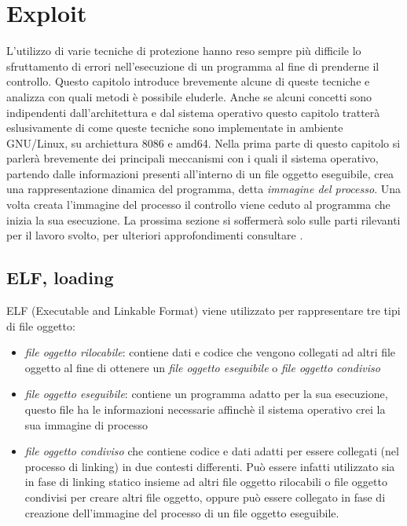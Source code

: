\chapter{Exploit}

L'utilizzo di varie tecniche di protezione hanno reso sempre più
difficile lo sfruttamento di errori nell'esecuzione di un programma al
fine di prenderne il controllo. Questo capitolo introduce brevemente
alcune di queste tecniche e analizza con quali metodi è possibile
eluderle. Anche se alcuni concetti sono indipendenti dall'architettura
e dal sistema operativo questo capitolo tratterà eslusivamente di come
queste tecniche sono implementate in ambiente GNU/Linux, su
archiettura 8086 e amd64. Nella prima parte di questo capitolo si
parlerà brevemente dei principali meccanismi con i quali il sistema
operativo, partendo dalle informazioni presenti all'interno di un file
oggetto eseguibile, crea una rappresentazione dinamica del programma,
detta \emph{immagine del processo}. Una volta creata l'immagine del
processo il controllo viene ceduto al programma che inizia la sua
esecuzione. La prossima sezione si soffermerà solo sulle parti
rilevanti per il lavoro svolto, per ulteriori approfondimenti
consultare \cited{}.

\section{ELF, loading}

ELF (Executable and Linkable Format) viene utilizzato per 
rappresentare tre tipi di file oggetto:

\begin{itemize}
  \item \emph{file oggetto rilocabile}: contiene dati e codice che
    vengono collegati ad altri file oggetto al fine di ottenere un
    \emph{file oggetto eseguibile} o \emph{file oggetto condiviso}

  \item \emph{file oggetto eseguibile}: contiene un programma adatto per la
    sua esecuzione, questo file ha le informazioni necessarie affinchè
    il sistema operativo crei la sua immagine di processo

  \item \emph{file oggetto condiviso} che contiene codice e dati
    adatti per essere collegati (nel processo di linking) in due
    contesti differenti. Può essere infatti utilizzato sia in fase di
    linking statico insieme ad altri file oggetto rilocabili o file
    oggetto condivisi per creare altri file oggetto, oppure può essere
    collegato in fase di creazione dell'immagine del processo di un
    file oggetto eseguibile.
\end{itemize}

